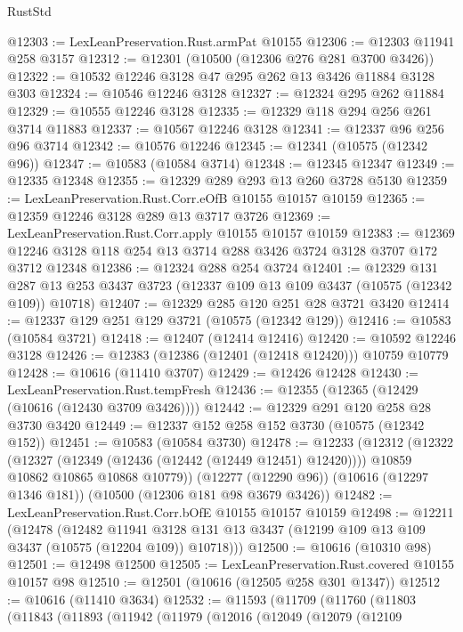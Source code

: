 \begin{lexlean}{RustStd}
\begin{coremodule}
@12303 := LexLeanPreservation.Rust.armPat @10155
@12306 := @12303 @11941 @258 @3157
@12312 := @12301 (@10500 (@12306 @276 @281 @3700 @3426))
@12322 := @10532 @12246 @3128 @47 @295 @262 @13 @3426 @11884 @3128 @303
@12324 := @10546 @12246 @3128
@12327 := @12324 @295 @262 @11884
@12329 := @10555 @12246 @3128
@12335 := @12329 @118 @294 @256 @261 @3714 @11883
@12337 := @10567 @12246 @3128
@12341 := @12337 @96 @256 @96 @3714
@12342 := @10576 @12246
@12345 := @12341 (@10575 (@12342 @96))
@12347 := @10583 (@10584 @3714)
@12348 := @12345 @12347
@12349 := @12335 @12348
@12355 := @12329 @289 @293 @13 @260 @3728 @5130
@12359 := LexLeanPreservation.Rust.Corr.eOfB @10155 @10157 @10159
@12365 := @12359 @12246 @3128 @289 @13 @3717 @3726
@12369 := LexLeanPreservation.Rust.Corr.apply @10155 @10157 @10159
@12383 := @12369 @12246 @3128 @118 @254 @13 @3714 @288 @3426 @3724 @3128 @3707 @172 @3712 @12348
@12386 := @12324 @288 @254 @3724
@12401 := @12329
    @131
    @287
    @13
    @253
    @3437
    @3723
    (@12337 @109 @13 @109 @3437 (@10575 (@12342 @109)) @10718)
@12407 := @12329 @285 @120 @251 @28 @3721 @3420
@12414 := @12337 @129 @251 @129 @3721 (@10575 (@12342 @129))
@12416 := @10583 (@10584 @3721)
@12418 := @12407 (@12414 @12416)
@12420 := @10592 @12246 @3128
@12426 := @12383 (@12386 (@12401 (@12418 @12420))) @10759 @10779
@12428 := @10616 (@11410 @3707)
@12429 := @12426 @12428
@12430 := LexLeanPreservation.Rust.tempFresh
@12436 := @12355 (@12365 (@12429 (@10616 (@12430 @3709 @3426))))
@12442 := @12329 @291 @120 @258 @28 @3730 @3420
@12449 := @12337 @152 @258 @152 @3730 (@10575 (@12342 @152))
@12451 := @10583 (@10584 @3730)
@12478 := @12233
    (@12312
      (@12322
        (@12327 (@12349 (@12436 (@12442 (@12449 @12451) @12420))))
        @10859
        @10862
        @10865
        @10868
        @10779))
    (@12277 (@12290 @96))
    (@10616 (@12297 @1346 @181))
    (@10500 (@12306 @181 @98 @3679 @3426))
@12482 := LexLeanPreservation.Rust.Corr.bOfE @10155 @10157 @10159
@12498 := @12211
    (@12478
      (@12482
        @11941
        @3128
        @131
        @13
        @3437
        (@12199 @109 @13 @109 @3437 (@10575 (@12204 @109)) @10718)))
@12500 := @10616 (@10310 @98)
@12501 := @12498 @12500
@12505 := LexLeanPreservation.Rust.covered @10155 @10157 @98
@12510 := @12501 (@10616 (@12505 @258 @301 @1347))
@12512 := @10616 (@11410 @3634)
@12532 := @11593
    (@11709
      (@11760
        (@11803
          (@11843
            (@11893
              (@11942
                (@11979
                  (@12016
                    (@12049
                      (@12079
                        (@12109

\end{coremodule}
\end{lexlean}
